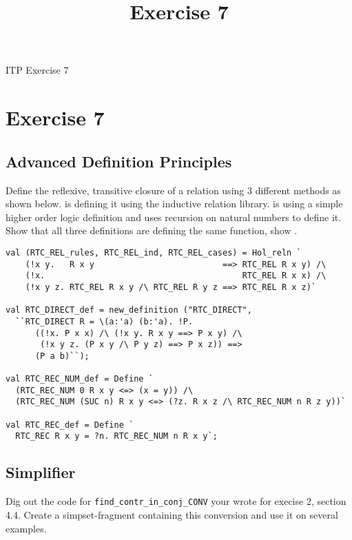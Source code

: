 \documentclass[a4paper,10pt,oneside]{scrartcl}
\title{Exercise 7}
\begin{document}
\begin{center}
ITP Exercise 7
\end{center}
\bigskip

\section{Exercise 7}



\subsection{Advanced Definition Principles}

Define the reflexive, transitive closure of a relation using 3 different methods as shown below.
 is defining it using the inductive relation library.  is
using a simple higher order logic definition and  uses recursion on natural numbers to define it. Show that all three definitions are defining the same function, \ie show
.


\begin{verbatim}
val (RTC_REL_rules, RTC_REL_ind, RTC_REL_cases) = Hol_reln `
    (!x y.   R x y                          ==> RTC_REL R x y) /\
    (!x.                                        RTC_REL R x x) /\
    (!x y z. RTC_REL R x y /\ RTC_REL R y z ==> RTC_REL R x z)`

val RTC_DIRECT_def = new_definition ("RTC_DIRECT",
  ``RTC_DIRECT R = \(a:'a) (b:'a). !P. 
      ((!x. P x x) /\ (!x y. R x y ==> P x y) /\ 
       (!x y z. (P x y /\ P y z) ==> P x z)) ==> 
      (P a b)``);

val RTC_REC_NUM_def = Define `
  (RTC_REC_NUM 0 R x y <=> (x = y)) /\
  (RTC_REC_NUM (SUC n) R x y <=> (?z. R x z /\ RTC_REC_NUM n R z y))`

val RTC_REC_def = Define `
  RTC_REC R x y = ?n. RTC_REC_NUM n R x y`;
\end{verbatim}


\subsection{Simplifier}

Dig out the code for \texttt{find\_contr\_in\_conj\_CONV} your wrote for execise 2, section 4.4. Create a simpset-fragment containing this conversion and use it on several examples.
\end{document}

